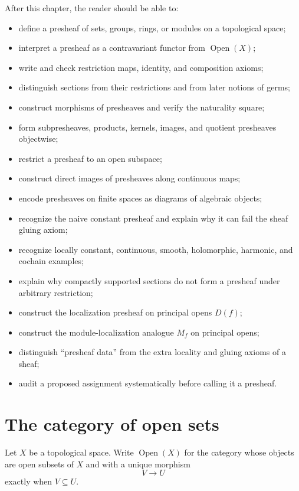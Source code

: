 After this chapter, the reader should be able to:
\begin{itemize}
\item define a presheaf of sets, groups, rings, or modules on a topological space;
\item interpret a presheaf as a contravariant functor from $\operatorname{Open}(X)$;
\item write and check restriction maps, identity, and composition axioms;
\item distinguish sections from their restrictions and from later notions of germs;
\item construct morphisms of presheaves and verify the naturality square;
\item form subpresheaves, products, kernels, images, and quotient presheaves objectwise;
\item restrict a presheaf to an open subspace;
\item construct direct images of presheaves along continuous maps;
\item encode presheaves on finite spaces as diagrams of algebraic objects;
\item recognize the naive constant presheaf and explain why it can fail the sheaf gluing axiom;
\item recognize locally constant, continuous, smooth, holomorphic, harmonic, and cochain examples;
\item explain why compactly supported sections do not form a presheaf under arbitrary restriction;
\item construct the localization presheaf on principal opens $D(f)$;
\item construct the module-localization analogue $M_f$ on principal opens;
\item distinguish ``presheaf data'' from the extra locality and gluing axioms of a sheaf;
\item audit a proposed assignment systematically before calling it a presheaf.
\end{itemize}

\section{The category of open sets}

Let $X$ be a topological space.  Write $\operatorname{Open}(X)$ for the category whose
objects are open subsets of $X$ and with a unique morphism
\[
V\longrightarrow U
\]
exactly when $V\subseteq U$.

